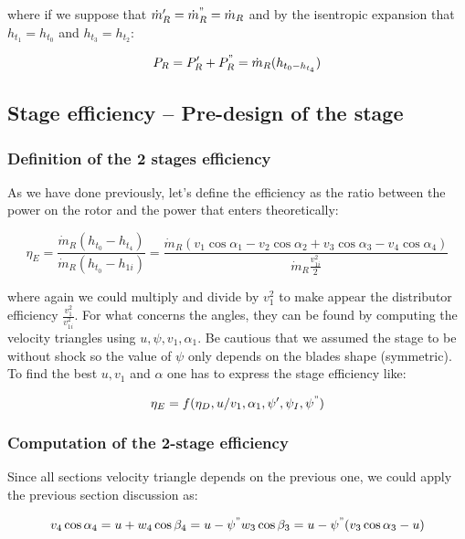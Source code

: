 where if we suppose that $\dot{m}'_R = \dot{m}^"_R = \dot{m}_R$ and by the isentropic expansion that $h_{t_1} = h_{t_0}$ and $h_{t_3}= h_{t_2}$: 

\begin{equation}
P_R = P_R' + P_R^" = \dot{m}_R (h_{t_0 - h_{t_4}})
\end{equation}

\subsection{Stage efficiency – Pre-design of the stage}
\subsubsection{Definition of the 2 stages efficiency}
As we have done previously, let's define the efficiency as the ratio between the power on the rotor and the power that enters theoretically: 

\begin{equation}
\eta _E = \frac{\dot{m}_R (h_{t_0}-h_{t_4})}{\dot{m}_R (h_{t_0}-h_{1i})} = \frac{\dot{m}_R(v_1 \cos \alpha _1 - v_2 \cos \alpha _2 +v_3 \cos \alpha _3 -v_4 \cos \alpha _4)}{\dot{m}_R \frac{v_{1i}^2}{2}}
\end{equation}

where again we could multiply and divide by $v_1^2$ to make appear the distributor efficiency $\frac{v_1^2}{v_{1i}^2}$. For what concerns the angles, they can be found by computing the velocity triangles using $u, \psi, v_1, \alpha _1$. Be cautious that we assumed the stage to be without shock so the value of $\psi$ only depends on the blades shape (symmetric). To find the best $u,v_1$ and $\alpha$ one has to express the stage efficiency like: 

\begin{equation}
\eta _E = f(\eta _D , u/v_1 , \alpha _1 , \psi ' , \psi _I , \psi ^")
\end{equation}

\subsubsection{Computation of the 2-stage efficiency}
Since all sections velocity triangle depends on the previous one, we could apply the previous section discussion as:

\begin{equation}
v_4\cos \alpha _4 = u+w_4 \cos \beta _4 = u -\psi ^" w_3 \cos \beta _3 = u -\psi ^" (v_3 \cos \alpha _3 - u)
\end{equation}

